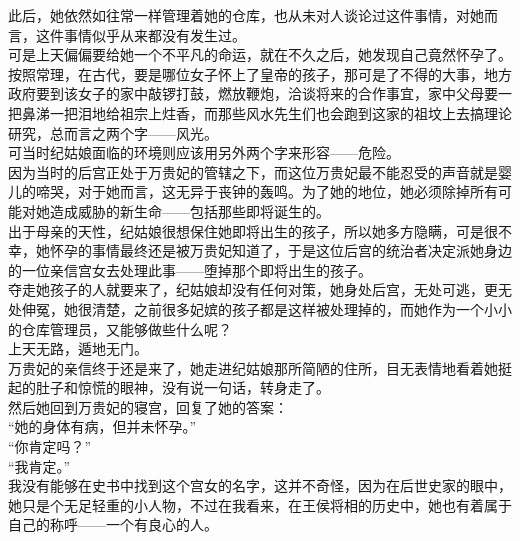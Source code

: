 \begin{multicols}{\theparacolNo}
此后，她依然如往常一样管理着她的仓库，也从未对人谈论过这件事情，对她而言，这件事情似乎从来都没有发生过。\\

可是上天偏偏要给她一个不平凡的命运，就在不久之后，她发现自己竟然怀孕了。\\

按照常理，在古代，要是哪位女子怀上了皇帝的孩子，那可是了不得的大事，地方政府要到该女子的家中敲锣打鼓，燃放鞭炮，洽谈将来的合作事宜，家中父母要一把鼻涕一把泪地给祖宗上炷香，而那些风水先生们也会跑到这家的祖坟上去搞理论研究，总而言之两个字——风光。\\

可当时纪姑娘面临的环境则应该用另外两个字来形容——危险。\\

因为当时的后宫正处于万贵妃的管辖之下，而这位万贵妃最不能忍受的声音就是婴儿的啼哭，对于她而言，这无异于丧钟的轰鸣。为了她的地位，她必须除掉所有可能对她造成威胁的新生命——包括那些即将诞生的。\\

出于母亲的天性，纪姑娘很想保住她即将出生的孩子，所以她多方隐瞒，可是很不幸，她怀孕的事情最终还是被万贵妃知道了，于是这位后宫的统治者决定派她身边的一位亲信宫女去处理此事——堕掉那个即将出生的孩子。\\

夺走她孩子的人就要来了，纪姑娘却没有任何对策，她身处后宫，无处可逃，更无处伸冤，她很清楚，之前很多妃嫔的孩子都是这样被处理掉的，而她作为一个小小的仓库管理员，又能够做些什么呢？\\

上天无路，遁地无门。\\

万贵妃的亲信终于还是来了，她走进纪姑娘那所简陋的住所，目无表情地看着她挺起的肚子和惊慌的眼神，没有说一句话，转身走了。\\

然后她回到万贵妃的寝宫，回复了她的答案：\\

“她的身体有病，但并未怀孕。”\\

“你肯定吗？”\\

“我肯定。”\\

我没有能够在史书中找到这个宫女的名字，这并不奇怪，因为在后世史家的眼中，她只是个无足轻重的小人物，不过在我看来，在王侯将相的历史中，她也有着属于自己的称呼——一个有良心的人。\\


\end{multicols}
